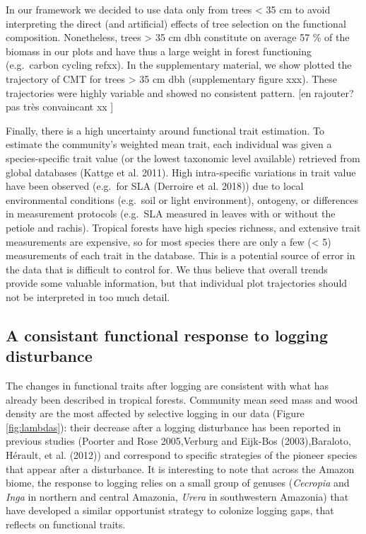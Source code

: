 \documentclass[]{elsarticle} %
\begin{document}
In our framework we decided to use data only from trees \textless{} 35
cm to avoid interpreting the direct (and artificial) effects of tree
selection on the functional composition. Nonetheless, trees
\textgreater{} 35 cm dbh constitute on average 57 \% of the biomass in
our plots and have thus a large weight in forest functioning
(e.g.~carbon cycling refxx). In the supplementary material, we show
plotted the trajectory of CMT for trees \textgreater{} 35 cm dbh
(supplementary figure xxx). These trajectories were highly variable and
showed no consistent pattern. {[}en rajouter? pas très convaincant xx
{]}

Finally, there is a high uncertainty around functional trait estimation.
To estimate the community's weighted mean trait, each individual was
given a species-specific trait value (or the lowest taxonomic level
available) retrieved from global databases (Kattge et al. 2011). High
intra-specific variations in trait value have been observed (e.g.~for
SLA (Derroire et al. 2018)) due to local environmental conditions
(e.g.~soil or light environment), ontogeny, or differences in
measurement protocols (e.g.~SLA measured in leaves with or without the
petiole and rachis). Tropical forests have high species richness, and
extensive trait measurements are expensive, so for most species there
are only a few (\textless{} 5) measurements of each trait in the
database. This is a potential source of error in the data that is
difficult to control for. We thus believe that overall trends provide
some valuable information, but that individual plot trajectories should
not be interpreted in too much detail.

\subsection{A consistant functional response to logging
disturbance}\label{a-consistant-functional-response-to-logging-disturbance}

The changes in functional traits after logging are consistent with what
has already been described in tropical forests. Community mean seed mass
and wood density are the most affected by selective logging in our data
(Figure \ref{fig:lambdas}): their decrease after a logging disturbance
has been reported in previous studies (Poorter and Rose 2005,Verburg and
Eijk-Bos (2003),Baraloto, Hérault, et al. (2012)) and correspond to
specific strategies of the pioneer species that appear after a
disturbance. It is interesting to note that across the Amazon biome, the
response to logging relies on a small group of genuses (\emph{Cecropia}
and \emph{Inga} in northern and central Amazonia, \emph{Urera} in
southwestern Amazonia) that have developed a similar opportunist
strategy to colonize logging gaps, that reflects on functional traits.
\end{document}

